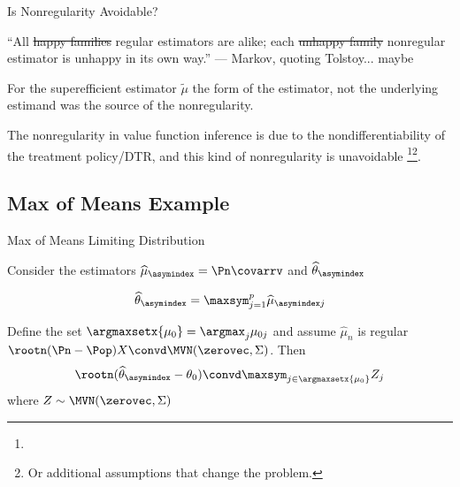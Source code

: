 \documentclass[aspectratio=169, professionalfonts]{beamer}
\begin{document}
\begin{frame}{Is Nonregularity Avoidable?}

	``All \sout{happy families} regular estimators are alike; each \sout{unhappy
		family} nonregular estimator is unhappy in its own way.'' --- Markov,
	quoting Tolstoy\pause... maybe

	\vfill \pause
	For the superefficient estimator $\tilde{\mu}$ the form of the estimator, not
	the underlying estimand was the source of the nonregularity.

	\vfill \pause

	The nonregularity in value function inference is due to the nondifferentiability of the treatment
	policy/DTR, and this kind of nonregularity is unavoidable
	\footnote<4->{}\footnote<4->{Or additional assumptions that change the problem.}.
	\vfill
\end{frame}

\subsection{Max of Means Example}
\begin{frame}{Max of Means Limiting Distribution}

	Consider the estimators $\widehat{\mu}_{\asymindex} = \Pn \covarrv$  and $\widehat{\theta}_{\asymindex}$

	$$\widehat{\theta}_{\asymindex} = \maxsym_{j = 1}^p \widehat{\mu}_{\asymindex j}$$

	\begin{lemma}
		Define the set $\argmaxsetx{\mu_{0}} = \argmax_j \mu_{0j}$ and assume
		$\widehat{\mu}_n$ is regular $\rootn (\Pn - \Pop)X \convd \MVN(\zerovec, \Sigma)$. Then
		\begin{displaymath}
			\rootn (\widehat{\theta}_{\asymindex} - \theta_0) \convd \maxsym_{j \in \argmaxsetx{\mu_0}} Z_j
		\end{displaymath}
		where $Z \sim \MVN(\zerovec, \Sigma)$
	\end{lemma}

\end{frame}
\end{document}
